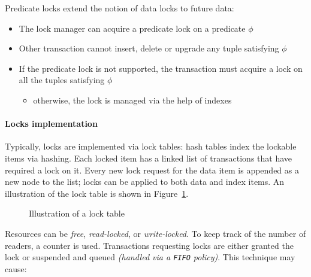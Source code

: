 \documentclass[english]{article}
\begin{document}
Predicate locks extend the notion of data locks to future data:
\begin{itemize}
  \item The lock manager can acquire a predicate lock on a predicate \(\phi\)
  \item Other transaction cannot insert, delete or upgrade any tuple satisfying \(\phi\)
  \item If the predicate lock is not supported, the transaction must acquire a lock on all the tuples satisfying \(\phi\)
        \begin{itemize}
          \item otherwise, the lock is managed via the help of indexes
        \end{itemize}
\end{itemize}

\paragraph{Locks implementation}

Typically, locks are implemented via lock tables: hash tables index the lockable items via hashing.
Each locked item has a linked list of transactions that have required a lock on it.
Every new lock request for the data item is appended as a new node to the list;
locks can be applied to both data and index items.
An illustration of the lock table is shown in Figure~\ref{fig:lock-table}.

\begin{figure}[htbp]
  \centering
  \bigskip
  \caption{Illustration of a lock table}
  \label{fig:lock-table}
  \bigskip
\end{figure}

Resources can be \textit{free}, \textit{read-locked}, or \textit{write-locked}.
To keep track of the number of readers, a counter is used.
Transactions requesting locks are either granted the lock or suspended and queued \textit{(handled via a \texttt{FIFO} policy)}.
This technique may cause:
\end{document}
